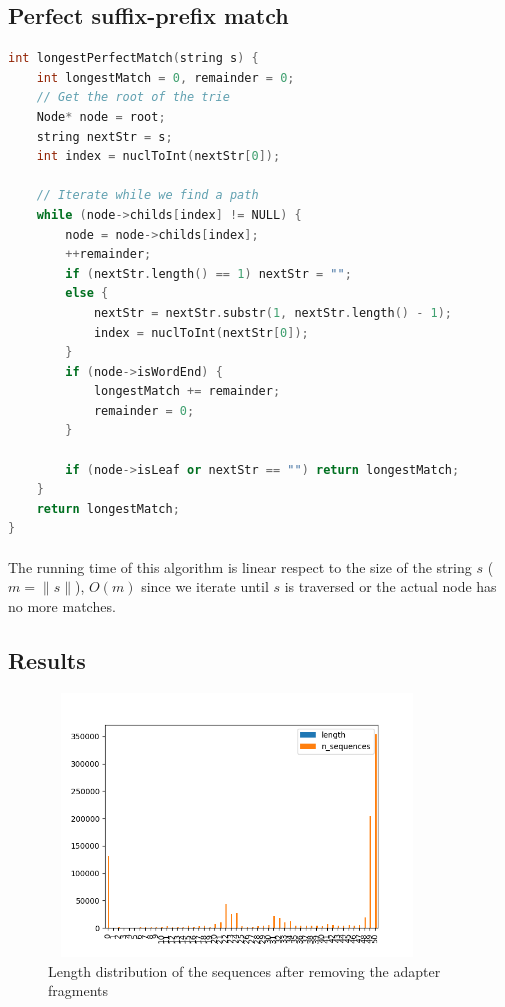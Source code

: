 \documentclass[a4paper,10pt]{article}
\begin{document}
\subsection{Perfect suffix-prefix match}

\begin{lstlisting}[language=c++, caption=Iterative algorithm for perfect suffix-prefix match]
int longestPerfectMatch(string s) {
    int longestMatch = 0, remainder = 0;
    // Get the root of the trie
    Node* node = root;
    string nextStr = s;
    int index = nuclToInt(nextStr[0]);

    // Iterate while we find a path
    while (node->childs[index] != NULL) {
        node = node->childs[index];
        ++remainder;
        if (nextStr.length() == 1) nextStr = "";
        else {
            nextStr = nextStr.substr(1, nextStr.length() - 1);
            index = nuclToInt(nextStr[0]);
        }
        if (node->isWordEnd) {
            longestMatch += remainder;
            remainder = 0;
        }

        if (node->isLeaf or nextStr == "") return longestMatch;
    }
    return longestMatch;
}
\end{lstlisting}

\paragraph{} The running time of this algorithm is linear respect to the size of the string $s$ ($m = \|s\|$), $O(m)$ since we iterate until $s$ is traversed or the actual node has no more matches.

\subsection{Results}

\begin{figure}[H]
    \centering
    \includegraphics[width=10cm, height=7cm]{images/length-distr.png}
    \caption{Length distribution of the sequences after removing the adapter fragments}
    \label{length-distr}
\end{figure}
\end{document}
